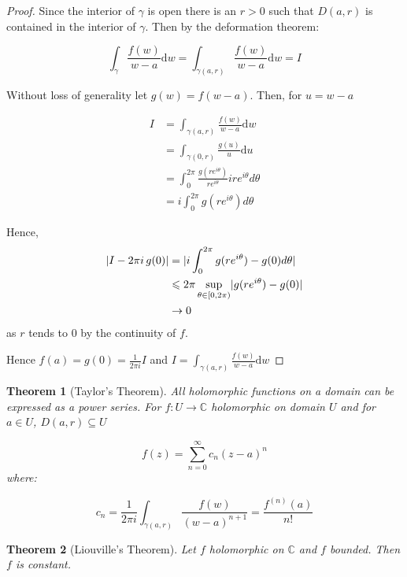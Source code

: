 \documentclass[11pt,a4paper, titlepage]{article}
\newtheorem{theorem}{Theorem}[section]
\DeclarePairedDelimiter\abs{\lvert}{\rvert}
\theoremstyle{definition}
\begin{document}
\begin{proof}

Since the interior of $\gamma$ is open there is an $r > 0$ such that $D(a,r)$ is contained in the interior of $\gamma$. Then by the deformation theorem:

\[
	\int_\gamma \frac{f(w)}{w-a} \mathrm{d}w = \int_{\gamma(a,r)} \frac{f(w)}{w-a} \mathrm{d}w = I
\]

Without loss of generality let $g(w) = f(w - a)$. Then, for $u = w - a$


\begin{align*}
	I &= \int_{\gamma(a,r)} \frac{f(w)}{w-a} \mathrm{d}w \\
	  &= \int_{\gamma(0,r)} \frac{g(u)}{u} \mathrm{d}u \\
	  &= \int_0^{2\pi} \frac{g(re^{i \theta})}{re^{i \theta}} i r e^{i \theta} d \theta \\
	  &= i \int_0^{2\pi} g(re^{i \theta}) d \theta 
\end{align*}

Hence, 
\begin{align*}
\abs{I - 2 \pi i \, g(0)} &= \abs{i \int_0^{2\pi} g(re^{i \theta}) - g(0) d \theta} \\
					      &\leqslant 2 \pi  \sup_{\theta \in [0,2 \pi)} \abs{g(re^{i \theta}) - g(0)}  \\
					      & \rightarrow 0 
\end{align*}
as $r$ tends to $0$ by the continuity of $f$.

Hence $f(a) = g(0) = \frac{1}{2 \pi i} I$ and $I = \int_{\gamma(a,r)} \frac{f(w)}{w-a} \mathrm{d}w$

\end{proof}

\begin{theorem}[Taylor's Theorem]

All holomorphic functions on a domain can be expressed as a power series. For $f \colon U \longrightarrow \mathbb{C}$ holomorphic on domain $U$ and for $a \in U$, $D(a,r) \subseteq U$

\[
	f(z) = 	\sum_{n=0}^\infty c_n (z-a)^n
\]
where:

\[
	c_n = \frac{1}{2 \pi i} \int_{\gamma(a,r)} \frac{f(w)}{(w-a)^{n+1}} = \frac{f^{(n)}(a)}{n!}
\]
\end{theorem}


\begin{theorem}[Liouville's Theorem]
Let $f$ holomorphic on $\mathbb{C}$ and $f$ bounded. Then $f$ is constant.
\end{theorem}
\end{document}

